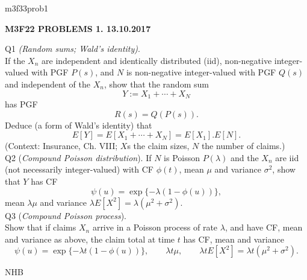 \documentclass[12pt]{article}
\begin{document}
\def\R{\mathbb{R}}
\def\C{\mathbb{C}}
\def\Z{\mathbb{Z}}
\def\N{\mathbb{N}}
\def\Q{\mathbb{Q}}
\def\D{\mathbb{D}}
\def\Sp{{\mathbb{S}}}
\def\T{\mathbb{T}}
\def\H{\mathbb{H}}
\def\hb{\hfil \break}
\def\ni{\noindent}
\def\i{\indent}
\def\a{\alpha}
\def\b{\beta}
\def\e{\epsilon}
\def\d{\delta}
\def\D{\Delta}
\def\G{\Gamma}
\def\g{\gamma}
\def\l{\lambda}
\def\m{\mu}
\def\s{\sigma}
\def\Si{\Sigma}
\def\th{\theta}
\def\z{\zeta}
\def\p{\partial}
\def\o{\omega}
\def\O{\Omega}
\def\t{\tau}
\def\L{\it \char'44}
\def\F{\mathcal{F}}
\def\B{\mathcal{B}}
\def\C{\mathcal{C}}
\def\half{\frac{1}{2}}
\ni m3f33prob1 \\
\begin{center}
{\bf M3F22 PROBLEMS 1.  13.10.2017} 
\end{center}
\ni Q1 {\it (Random sums; Wald's identity)}.  \\
\i If the $X_n$ are independent and identically distributed (iid), non-negative integer-valued with PGF $P(s)$, and $N$ is non-negative integer-valued with PGF $Q(s)$ and independent of the $X_n$, show that the random sum
$$
Y := X_1 + \cdots + X_N
$$
has PGF
$$
R(s) = Q(P(s)).
$$
Deduce (a form of Wald's identity) that
$$
E[Y] = E[X_1 + \cdots + X_N] = E[X_1].E[N].
$$
(Context: Insurance, Ch. VIII; $X$s the claim sizes, $N$ the number of claims.) \\

\ni Q2  ({\it Compound Poisson distribution}).  If $N$ is Poisson $P(\l)$ and the $X_n$ are iid (not necessarily integer-valued) with CF $\phi(t)$, mean $\mu$ and variance ${\sigma}^2$, show that $Y$ has CF
$$
\psi(u) = \exp \{ -\l (1 - \phi(u)) \},
$$
mean $\l \mu$ and variance $\l E[X^2] = \l ({\mu}^2 + {\sigma}^2)$. \\

\ni Q3 ({\it Compound Poisson process}). \\
\i Show that if claims $X_n$ arrive in a Poisson process of rate $\l$, and have CF, mean and variance as above, the claim total at time $t$ has CF, mean and variance    
$$
\psi(u) = \exp \{ -\l t (1 - \phi(u)) \}, \qquad \l t \mu, \qquad \l t E[X^2] = \l t ({\mu}^2 + {\sigma}^2).
$$

\hfil NHB \break 
\end{document}
